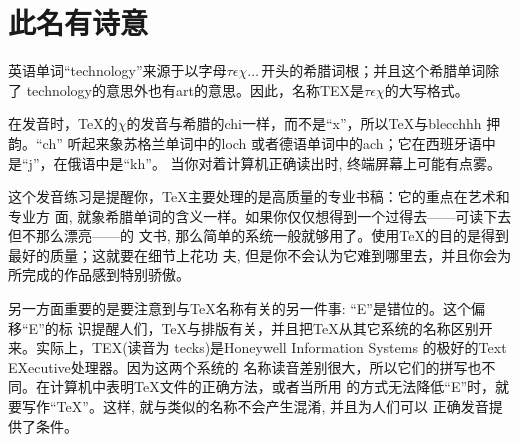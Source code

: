 
\chapter*{此名有诗意}
英语单词“technology”来源于以字母$\tau\epsilon\chi\ldots\,$开头的希腊词根；并且这个希腊单词除了
technology的意思外也有art的意思。因此，名称TEX是$\tau\epsilon\chi$的大写格式。

在发音时，\TeX 的$\chi$的发音与希腊的chi一样，而不是“x”，所以\TeX 与blecchhh 押韵。“ch”
听起来象苏格兰单词中的loch 或者德语单词中的ach；它在西班牙语中是“j”，在俄语中是“kh”。
当你对着计算机正确读出时, 终端屏幕上可能有点雾。

这个发音练习是提醒你，\TeX 主要处理的是高质量的专业书稿：它的重点在艺术和专业方
面, 就象希腊单词的含义一样。如果你仅仅想得到一个过得去——可读下去但不那么漂亮——的
文书, 那么简单的系统一般就够用了。使用\TeX 的目的是得到最好的质量；这就要在细节上花功
夫, 但是你不会认为它难到哪里去，并且你会为所完成的作品感到特别骄傲。

另一方面重要的是要注意到与\TeX 名称有关的另一件事: “E”是错位的。这个偏移“E”的标
识提醒人们，\TeX 与排版有关，并且把\TeX 从其它系统的名称区别开来。实际上，TEX(读音为
tecks)是Honeywell Information Systems 的极好的Text EXecutive处理器。因为这两个系统的
名称读音差别很大，所以它们的拼写也不同。在计算机中表明\TeX 文件的正确方法，或者当所用
的方式无法降低“E”时，就要写作“TeX”。这样, 就与类似的名称不会产生混淆, 并且为人们可以
正确发音提供了条件。